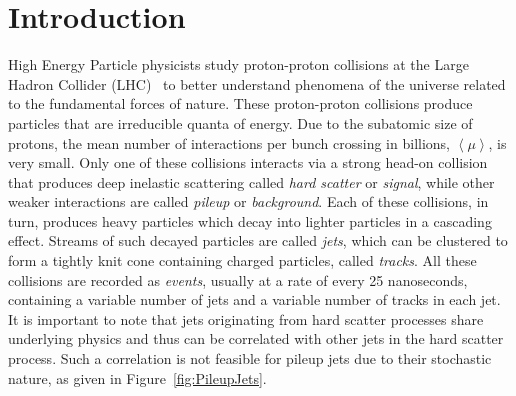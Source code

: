 \section{Introduction}\hfill


High Energy Particle physicists study proton-proton collisions at the Large Hadron Collider (LHC)~\cite{LHC} to better understand phenomena of the universe related to the fundamental forces of nature. These proton-proton collisions produce particles that are irreducible quanta of energy.
Due to the subatomic size of protons, the mean number of interactions per bunch crossing in billions, $\left\langle \mu \right\rangle$, is very small. Only one of these collisions interacts via a strong head-on collision that produces deep inelastic scattering called \emph{hard scatter} or \emph{signal}, while other weaker interactions are called \emph{pileup} or \emph{background}. 
Each of these collisions, in turn, produces heavy particles which decay into lighter particles in a cascading effect. Streams of such decayed particles are called \emph{jets}, which can be clustered to form a tightly knit cone containing charged particles, called \emph{tracks}. All these collisions are recorded as \emph{events}, usually at a rate of every 25 nanoseconds, containing a variable number of jets and a variable number of tracks in each jet. It is important to note that jets originating from hard scatter processes share underlying physics and thus can be correlated with other jets in the hard scatter process. Such a correlation is not feasible for pileup jets due to their stochastic nature, as given in Figure~\ref{fig:PileupJets}.

